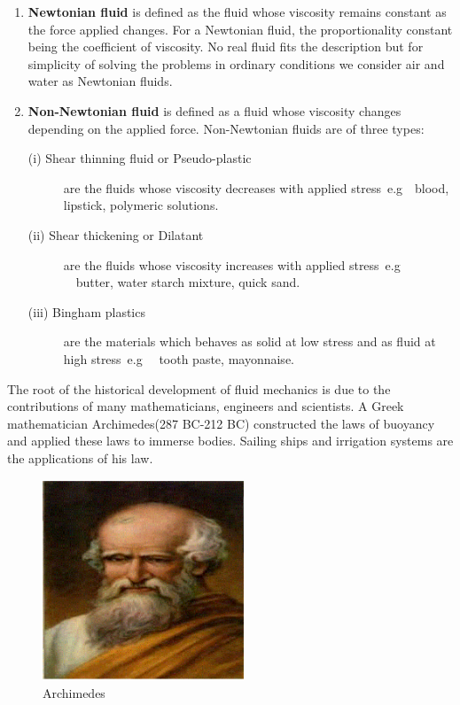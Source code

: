  \begin{enumerate}
   \item \textbf{ Newtonian fluid} is defined as the fluid whose viscosity remains constant as the force applied changes. For a Newtonian fluid, the proportionality constant being the coefficient of viscosity. No real fluid fits the description but for simplicity of solving the problems in ordinary conditions we consider air and water as Newtonian fluids.
   \item  \textbf{Non-Newtonian fluid} is defined as a fluid whose viscosity changes depending on the applied force.  Non-Newtonian fluids are of three types:\begin{description}
               \item[
              (i) Shear thinning fluid or Pseudo-plastic]  are the fluids whose viscosity decreases with applied stress\ e.g\ \  blood, lipstick, polymeric solutions.
               \item[(ii) Shear thickening or
               Dilatant]  are the fluids whose viscosity increases with applied stress\ e.g \ \ butter, water starch mixture, quick sand.
               \item[(iii) Bingham plastics]  are the materials which behaves as solid at low stress and as fluid at high stress\ e.g \ \ tooth paste, mayonnaise.
             \end{description}
 \end{enumerate}

\noindent The root of the  historical development of fluid mechanics is due to the contributions of many mathematicians, engineers and scientists. A Greek mathematician Archimedes(287 BC-212 BC) constructed the laws of buoyancy and applied these laws to immerse bodies. Sailing ships and irrigation systems are the applications of his law.
\begin{figure}\begin{center}
\includegraphics[width=6cm, height=6cm]{archimedes.eps}
\caption{Archimedes }\label{fig:Archimedes}
\end{center}\end{figure}

